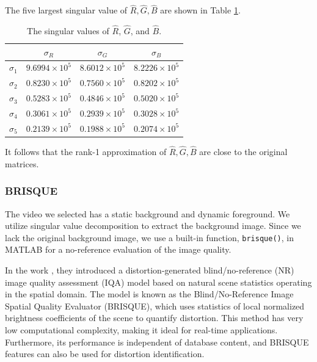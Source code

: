 \documentclass[12pt]{article}
\theoremstyle{definition}
\begin{document}
\noindent
The five largest singular value of $\hat{R},\hat{G},\hat{B}$ are shown in Table \ref{tab:eraser_singular_values}.

\begin{table}[ht]
    \centering
    \begin{tabular}{@{}cccc@{}}
        \toprule
         & $\sigma_R$ & $\sigma_G$ & $\sigma_B$ \\
        \midrule
        $\sigma_1$ & $9.6994 \times 10^5$ & $8.6012 \times 10^5$ & $8.2226 \times 10^5$ \\
        $\sigma_2$ & $0.8230 \times 10^5$ & $0.7560 \times 10^5$ & $0.8202 \times 10^5$ \\
        $\sigma_3$ & $0.5283 \times 10^5$ & $0.4846 \times 10^5$ & $0.5020 \times 10^5$ \\
        $\sigma_4$ & $0.3061 \times 10^5$ & $0.2939 \times 10^5$ & $0.3028 \times 10^5$ \\
        $\sigma_5$ & $0.2139 \times 10^5$ & $0.1988 \times 10^5$ & $0.2074 \times 10^5$ \\
        \bottomrule
    \end{tabular}
    \caption{The singular values of $\hat{R}$, $\hat{G}$, and $\hat{B}$.}
    \label{tab:eraser_singular_values}
\end{table}

\noindent
It follows that the rank-1 approximation of $\hat{R},\hat{G},\hat{B}$ are close to the original matrices.

\subsubsection{BRISQUE}
The video we selected has a static background and dynamic foreground. We utilize singular value decomposition to extract the background image. Since we lack the original background image, we use a built-in function, \texttt{brisque()}, in MATLAB for a no-reference evaluation of the image quality.

In the work \cite{mittal2012no}, they introduced a distortion-generated blind/no-reference (NR) image quality assessment (IQA) model based on natural scene statistics operating in the spatial domain. The model is known as the Blind/No-Reference Image Spatial Quality Evaluator (BRISQUE), which uses statistics of local normalized brightness coefficients of the scene to quantify distortion. This method has very low computational complexity, making it ideal for real-time applications. Furthermore, its performance is independent of database content, and BRISQUE features can also be used for distortion identification.
\end{document}
